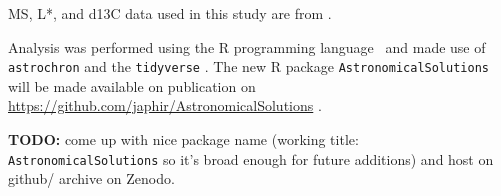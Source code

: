 \documentclass[draft]{agujournal2019}
\begin{document}
\Gls{MS}, \gls{L*}, and \gls{d13C} data used in this study are from .

Analysis was performed using the R programming language~\cite{RCoreTeam2020} and made use of \texttt{astrochron}  and the \texttt{tidyverse} .
The new R package \texttt{AstronomicalSolutions} will be made available on publication on \url{https://github.com/japhir/AstronomicalSolutions} .

\textbf{TODO:} come up with nice package name (working title: \texttt{AstronomicalSolutions} so it's broad enough for future additions) and host on github/ archive on Zenodo.







\acknowledgments
\end{document}

